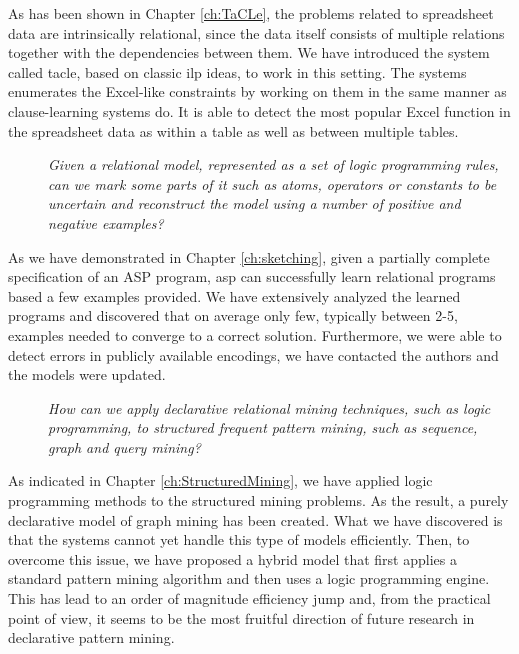 As has been shown in Chapter \ref{ch:TaCLe}, the problems related to
spreadsheet data are intrinsically relational, since the data itself
consists of multiple relations together with the dependencies between
them. We have introduced the system called \acrlong{tacle}, based on
classic \acrshort{ilp} ideas, to work in this setting. The systems
enumerates the Excel-like constraints by working on them in the same
manner as clause-learning systems do. It is able to detect the most
popular Excel function in the spreadsheet data as within a table as
well as between multiple tables.

\begin{description}
    \item[\cthree] \textit{Given a relational model, represented as a set of logic
    programming rules, can we mark some parts of it such as atoms,
    operators or constants to be uncertain and reconstruct the model
    using a number of positive and negative examples?}
\end{description}

As we have demonstrated in Chapter \ref{ch:sketching}, given a
partially complete specification of an ASP program, \acrshort{asp}
can successfully learn relational programs based a few examples
provided. We have extensively analyzed the learned programs and
discovered that on average only few, typically between 2-5, examples needed to
converge to a correct solution. Furthermore, we were able to detect
errors in publicly available encodings, we have contacted the authors
and the models were updated.


\begin{description}
\item[\cfour]  \textit{How can we apply declarative relational mining
    techniques, such as logic programming, to structured frequent pattern mining, such as sequence, graph and query mining?}
\end{description}

As indicated in Chapter \ref{ch:StructuredMining}, we have applied 
logic programming methods to the structured mining problems. As the
result, 
a purely declarative model of graph mining has been created. What we
have discovered is that the systems cannot yet handle this type of
models efficiently. Then, to overcome this issue, we have proposed a hybrid model that
first applies a standard pattern mining algorithm and then uses a
logic programming engine. This has lead to an order of magnitude
efficiency jump and, from the practical point of view, it seems to be
the most fruitful direction of future research in declarative pattern
mining.



\cleardoublepage

